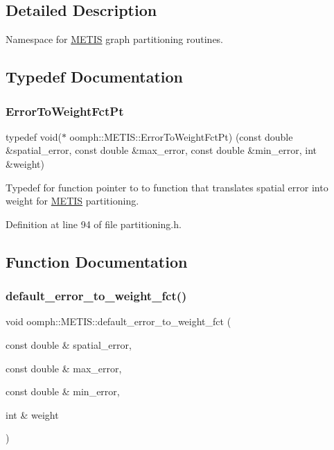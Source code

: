 \subsection{Detailed Description}
Namespace for \hyperlink{namespaceoomph_1_1METIS}{M\+E\+T\+IS} graph partitioning routines. 

\subsection{Typedef Documentation}
\mbox{\label{namespaceoomph_1_1METIS_aec228e35df8426d16639b961fcf98df1}} 
\subsubsection{\texorpdfstring{Error\+To\+Weight\+Fct\+Pt}{ErrorToWeightFctPt}}
{\footnotesize\ttfamily typedef void($\ast$ oomph\+::\+M\+E\+T\+I\+S\+::\+Error\+To\+Weight\+Fct\+Pt) (const double \&spatial\+\_\+error, const double \&max\+\_\+error, const double \&min\+\_\+error, int \&weight)}



Typedef for function pointer to to function that translates spatial error into weight for \hyperlink{namespaceoomph_1_1METIS}{M\+E\+T\+IS} partitioning. 



Definition at line 94 of file partitioning.\+h.



\subsection{Function Documentation}
\mbox{\label{namespaceoomph_1_1METIS_af5633647d4ff099648151db2d7d0a1e5}} 
\subsubsection{\texorpdfstring{default\+\_\+error\+\_\+to\+\_\+weight\+\_\+fct()}{default\_error\_to\_weight\_fct()}}
{\footnotesize\ttfamily void oomph\+::\+M\+E\+T\+I\+S\+::default\+\_\+error\+\_\+to\+\_\+weight\+\_\+fct (\begin{DoxyParamCaption}\item[{const double \&}]{spatial\+\_\+error,  }\item[{const double \&}]{max\+\_\+error,  }\item[{const double \&}]{min\+\_\+error,  }\item[{int \&}]{weight }\end{DoxyParamCaption})}



